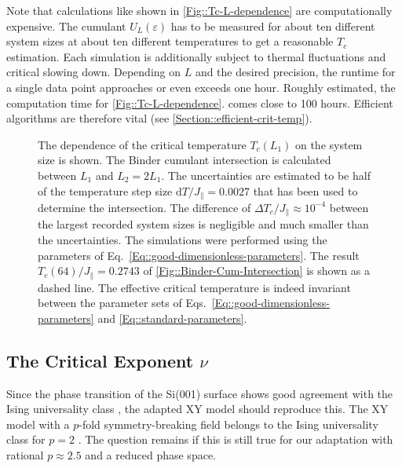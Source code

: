 	Note that calculations like shown in \autoref{Fig::Tc-L-dependence} are computationally expensive. The cumulant $U_L(\varepsilon)$ has to be measured for about ten different system sizes at about ten different temperatures to get a reasonable $T_c$ estimation. Each simulation is additionally subject to thermal fluctuations and critical slowing down. Depending on $L$ and the desired precision, the runtime for a single data point approaches or even exceeds one hour.  Roughly estimated, the computation time for \autoref{Fig::Tc-L-dependence}. comes close to 100 hours. Efficient algorithms are therefore vital (see \autoref{Section::efficient-crit-temp}).
	\begin{figure}[tb]
		\centering
		
		\caption{The dependence of the critical temperature $T_c(L_1)$ on the system size is shown. The Binder cumulant intersection is calculated between $L_1$ and $L_{2} =	2 L_{1}$. The uncertainties are estimated to be half of the temperature step size $\text{d}T /	J_\parallel = 0.0027$ that has been used to determine the intersection. The difference of $\Delta T_c /	J_\parallel \approx 10^{-4}$ between the largest recorded system sizes is negligible and much smaller than the uncertainties. The simulations were performed using the parameters of Eq.~\eqref{Eq::good-dimensionless-parameters}. The result $T_c(64) / J_\parallel =	0.2743$ of \autoref{Fig::Binder-Cum-Intersection} is shown as a dashed line. The effective critical temperature is indeed invariant between the parameter sets of Eqs.~\eqref{Eq::good-dimensionless-parameters} and \eqref{Eq::standard-parameters}.}
		\label{Fig::Tc-L-dependence}
	\end{figure}
	\subsection{The Critical Exponent ${\nu}$} \label{Section::static-scaling}
	Since the phase transition of the Si(001) surface shows good agreement with the Ising universality class \cite{brand2023critical}, the adapted XY model should reproduce this. The XY model with a $p$-fold symmetry-breaking field belongs to the Ising universality class for $p=2$ \cite{jose1977renormalization}. The question remains if this is still true for our adaptation with rational $p \approx 2.5$ and a reduced phase space. \\
	
